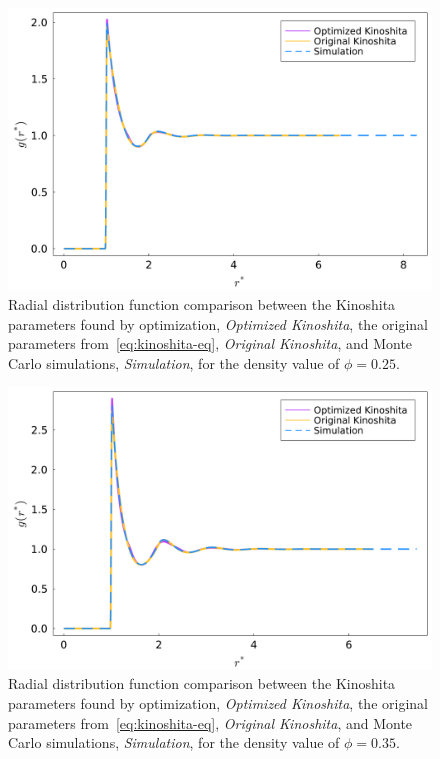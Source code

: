 \begin{figure}
    \centering
    \includegraphics[scale=0.35]{figuras/capitulo-5/rdf_phi=0.25.pdf}
    \caption{Radial distribution function comparison between the Kinoshita parameters found by optimization, \emph{Optimized Kinoshita}, the original parameters from~\autoref{eq:kinoshita-eq}, \emph{Original Kinoshita}, and Monte Carlo simulations, \emph{Simulation}, for the density value of \(\phi=0.25 .\)}
    \label{fig:rdf-kinoshita-025}
\end{figure}

\begin{figure}
    \centering
    \includegraphics[scale=0.35]{figuras/capitulo-5/rdf_phi=0.35.pdf}
    \caption{Radial distribution function comparison between the Kinoshita parameters found by optimization, \emph{Optimized Kinoshita}, the original parameters from~\autoref{eq:kinoshita-eq}, \emph{Original Kinoshita}, and Monte Carlo simulations, \emph{Simulation}, for the density value of \(\phi=0.35 .\)}
    \label{fig:rdf-kinoshita-035}
\end{figure}


